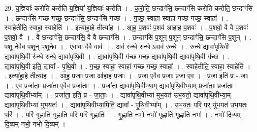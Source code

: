 \documentclass[17pt]{extarticle}
\begin{document}
29. य॒ज्ञियाः᳚ करोति करोति य॒ज्ञिया॑ य॒ज्ञियाः᳚ करोति । . क॒रो॒ति॒ छन्दाꣳ॑सि॒ छन्दाꣳ॑सि करोति करोति॒ छन्दाꣳ॑सि । . छन्दाꣳ॑सि गच्छ गच्छ॒ छन्दाꣳ॑सि॒ छन्दाꣳ॑सि गच्छ । . ग॒च्छ॒ स्वाहा॒ स्वाहा॑ गच्छ गच्छ॒ स्वाहा᳚ । . स्वाहेतीति॒ स्वाहा॒ स्वाहेति॑ । . इत्या॑हा॒हे तीत्या॑ह । . आ॒ह॒ प॒शवः॑ प॒शव॑ आहाह प॒शवः॑ । . प॒शवो॒ वै वै प॒शवः॑ प॒शवो॒ वै । . वै छन्दाꣳ॑सि॒ छन्दाꣳ॑सि॒ वै वै छन्दाꣳ॑सि । . छन्दाꣳ॑सि प॒शून् प॒शून् छन्दाꣳ॑सि॒ छन्दाꣳ॑सि प॒शून् । . प॒शू ने॒वैव प॒शून् प॒शूने॒व । . ए॒वावा वै॒वै वाव॑ । . अव॑ रुन्धे रु॒न्धे ऽवाव॑ रुन्धे । . रु॒न्धे॒ द्यावा॑पृथि॒वी द्यावा॑पृथि॒वी रु॑न्धे रुन्धे॒ द्यावा॑पृथि॒वी । . द्यावा॑पृथि॒वी ग॑च्छ गच्छ॒ द्यावा॑पृथि॒वी द्यावा॑पृथि॒वी ग॑च्छ । . द्यावा॑पृथि॒वी इति॒ द्यावा᳚ - पृ॒थि॒वी । . ग॒च्छ॒ स्वाहा॒ स्वाहा॑ गच्छ गच्छ॒ स्वाहा᳚ । . स्वाहेतीति॒ स्वाहा॒ स्वाहेति॑ । . इत्या॑हा॒हे तीत्या॑ह । . आ॒ह॒ प्र॒जाः प्र॒जा आ॑हाह प्र॒जाः । . प्र॒जा ए॒वैव प्र॒जाः प्र॒जा ए॒व । . प्र॒जा इति॑ प्र - जाः । . ए॒व प्रजा॑ताः॒ प्रजा॑ता ए॒वैव प्रजा॑ताः । . प्रजा॑ता॒ द्यावा॑पृथि॒वीभ्या॒म् द्यावा॑पृथि॒वीभ्या॒म् प्रजा॑ताः॒ प्रजा॑ता॒ द्यावा॑पृथि॒वीभ्या᳚म् । . प्रजा॑ता॒ इति॒ प्र - जा॒ताः॒ । . द्यावा॑पृथि॒वीभ्या॑ मुभ॒यत॑ उभ॒यतो॒ द्यावा॑पृथि॒वीभ्या॒म् द्यावा॑पृथि॒वीभ्या॑ मुभ॒यतः॑ । . द्यावा॑पृथि॒वीभ्या॒मिति॒ द्यावा᳚ - पृ॒थि॒वीभ्या᳚म् । . उ॒भ॒यतः॒ परि॒ पर् यु॑भ॒यत॑ उभ॒यतः॒ परि॑ । . परि॑ गृह्णाति गृह्णाति॒ परि॒ परि॑ गृह्णाति । . गृ॒ह्णा॒ति॒ नभो॒ नभो॑ गृह्णाति गृह्णाति॒ नभः॑ । . नभो॑ दि॒व्यम् दि॒व्यम् नभो॒ नभो॑ दि॒व्यम् । \newline
\end{document}
